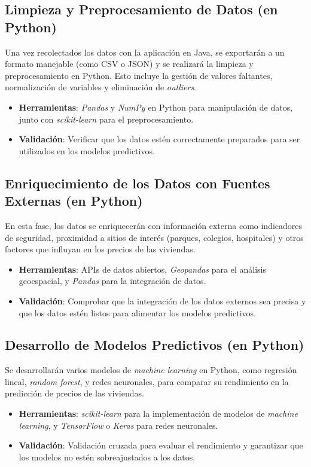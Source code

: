 \subsection*{Limpieza y Preprocesamiento de Datos (en Python)}
Una vez recolectados los datos con la aplicación en Java, se exportarán a un formato manejable (como CSV o JSON) y se realizará la limpieza y preprocesamiento en Python. Esto incluye la gestión de valores faltantes, normalización de variables y eliminación de \textit{outliers}.

\begin{itemize}
    \item \textbf{Herramientas}: \textit{Pandas} y \textit{NumPy} en Python para manipulación de datos, junto con \textit{scikit-learn} para el preprocesamiento.
    \item \textbf{Validación}: Verificar que los datos estén correctamente preparados para ser utilizados en los modelos predictivos.
\end{itemize}

\subsection*{Enriquecimiento de los Datos con Fuentes Externas (en Python)}
En esta fase, los datos se enriquecerán con información externa como indicadores de seguridad, proximidad a sitios de interés (parques, colegios, hospitales) y otros factores que influyan en los precios de las viviendas.

\begin{itemize}
    \item \textbf{Herramientas}: APIs de datos abiertos, \textit{Geopandas} para el análisis geoespacial, y \textit{Pandas} para la integración de datos.
    \item \textbf{Validación}: Comprobar que la integración de los datos externos sea precisa y que los datos estén listos para alimentar los modelos predictivos.
\end{itemize}

\subsection*{Desarrollo de Modelos Predictivos (en Python)}
Se desarrollarán varios modelos de \textit{machine learning} en Python, como regresión lineal, \textit{random forest}, y redes neuronales, para comparar su rendimiento en la predicción de precios de las viviendas.

\begin{itemize}
    \item \textbf{Herramientas}: \textit{scikit-learn} para la implementación de modelos de \textit{machine learning}, y \textit{TensorFlow} o \textit{Keras} para redes neuronales.
    \item \textbf{Validación}: Validación cruzada para evaluar el rendimiento y garantizar que los modelos no estén sobreajustados a los datos.
\end{itemize}

